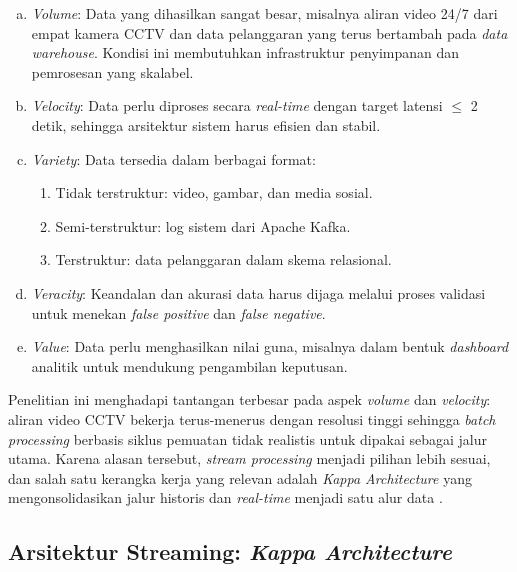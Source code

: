 \begin{enumerate}[a.]
  \item \textit{Volume}: Data yang dihasilkan sangat besar, misalnya aliran video 24/7 dari empat kamera CCTV dan data pelanggaran yang terus bertambah pada \textit{data warehouse}. Kondisi ini membutuhkan infrastruktur penyimpanan dan pemrosesan yang skalabel.

  \item \textit{Velocity}: Data perlu diproses secara \textit{real-time} dengan target latensi $\leq$ 2 detik, sehingga arsitektur sistem harus efisien dan stabil.

  \item \textit{Variety}: Data tersedia dalam berbagai format:
  \begin{enumerate}[1).]
    \item Tidak terstruktur: video, gambar, dan media sosial.
    \item Semi-terstruktur: log sistem dari Apache Kafka.
    \item Terstruktur: data pelanggaran dalam skema relasional.
  \end{enumerate}

\item \textit{Veracity}: Keandalan dan akurasi data harus dijaga melalui proses validasi untuk menekan \textit{false positive} dan \textit{false negative}.

\item \textit{Value}: Data perlu menghasilkan nilai guna, misalnya dalam bentuk \textit{dashboard} analitik untuk mendukung pengambilan keputusan.
\end{enumerate}

Penelitian ini menghadapi tantangan terbesar pada aspek \textit{volume} dan \textit{velocity}: aliran video CCTV bekerja terus-menerus dengan resolusi tinggi sehingga \textit{batch processing} berbasis siklus pemuatan tidak realistis untuk dipakai sebagai jalur utama. Karena alasan tersebut, \textit{stream processing} menjadi pilihan lebih sesuai, dan salah satu kerangka kerja yang relevan adalah \textit{Kappa Architecture} yang mengonsolidasikan jalur historis dan \textit{real-time} menjadi satu alur data \cite{marz2015big}.

\subsection{Arsitektur Streaming: \textit{Kappa Architecture}}

